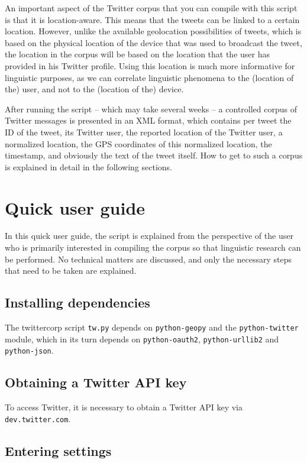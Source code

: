 \documentclass[a4paper,10pt]{article}
\begin{document}
An important aspect of the Twitter corpus that you can compile with this script is that it is location-aware. This means that the tweets can be linked to a certain location. However, unlike the available geolocation possibilities of tweets, which is based on the physical location of the device that was used to broadcast the tweet, the location in the corpus will be based on the location that the user has provided in his Twitter profile. Using this location is much more informative for linguistic purposes, as we can correlate linguistic phenomena to the (location of the) user, and not to the (location of the) device.

After running the script -- which may take several weeks -- a controlled corpus of Twitter messages is presented in an XML format, which contains per tweet the ID of the tweet, its Twitter user, the reported location of the Twitter user, a normalized location, the GPS coordinates of this normalized location, the timestamp, and obviously the text of the tweet itself. How to get to such a corpus is explained in detail in the following sections.

\section{Quick user guide}

In this quick user guide, the script is explained from the perspective of the user who is primarily interested in compiling the corpus so that linguistic research can be performed. No technical matters are discussed, and only the necessary steps that need to be taken are explained.

\subsection{Installing dependencies}

The twittercorp script \texttt{tw.py} depends on \texttt{python-geopy} and the \texttt{python-twitter} module, which in its turn depends on \texttt{python-oauth2}, \texttt{python-urllib2} and \texttt{python-json}.

\subsection{Obtaining a Twitter API key}

To access Twitter, it is necessary to obtain a Twitter API key via \texttt{dev.twitter.com}.

\subsection{Entering settings}
\end{document}
